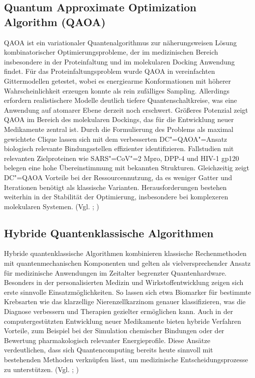 \subsection{Quantum Approximate Optimization Algorithm (QAOA)}
QAOA ist ein variationaler Quantenalgorithmus zur näherungsweisen Lösung kombinatorischer Optimierungsprobleme, der im medizinischen Bereich insbesondere in der Proteinfaltung und im molekularen Docking Anwendung findet. Für das Proteinfaltungsproblem wurde QAOA in vereinfachten Gittermodellen getestet, wobei es energiearme Konformationen mit höherer Wahrscheinlichkeit erzeugen konnte als rein zufälliges Sampling. Allerdings erfordern realistischere Modelle deutlich tiefere Quantenschaltkreise, was eine Anwendung auf atomarer Ebene derzeit noch erschwert. Größeres Potenzial zeigt QAOA im Bereich des molekularen Dockings, das für die Entwicklung neuer Medikamente zentral ist. Durch die Formulierung des Problems als maximal gewichtete Clique lassen sich mit dem verbesserten DC"=QAOA"=Ansatz biologisch relevante Bindungsstellen effizienter identifizieren. Fallstudien mit relevanten Zielproteinen wie SARS"=CoV"=2 Mpro, DPP-4 und HIV-1 gp120 belegen eine hohe Übereinstimmung mit bekannten Strukturen. Gleichzeitig zeigt DC"=QAOA Vorteile bei der Ressourcennutzung, da es weniger Gatter und Iterationen benötigt als klassische Varianten. Herausforderungen bestehen weiterhin in der Stabilität der Optimierung, insbesondere bei komplexeren molekularen Systemen. (Vgl. \cite{DingMolecularDocking2024}; \cite{boulebnane_peptide_2023})

\subsection{Hybride Quantenklassische Algorithmen}
Hybride quantenklassische Algorithmen kombinieren klassische Rechenmethoden mit quantenmechanischen Komponenten und gelten als vielversprechender Ansatz für medizinische Anwendungen im Zeitalter begrenzter Quantenhardware. Besonders in der personalisierten Medizin und Wirkstoffentwicklung zeigen sich erste sinnvolle Einsatzmöglichkeiten. So lassen sich etwa Biomarker für bestimmte Krebsarten wie das klarzellige Nierenzellkarzinom genauer klassifizieren, was die Diagnose verbessern und Therapien gezielter ermöglichen kann. Auch in der computergestützten Entwicklung neuer Medikamente bieten hybride Verfahren Vorteile, zum Beispiel bei der Simulation chemischer Bindungen oder der Bewertung pharmakologisch relevanter Energieprofile. Diese Ansätze verdeutlichen, dass sich Quantencomputing bereits heute sinnvoll mit bestehenden Methoden verknüpfen lässt, um medizinische Entscheidungsprozesse zu unterstützen. (Vgl. \cite{li_hybrid_2024}; \cite{Astuti2025})

